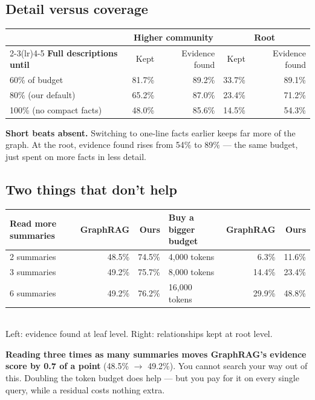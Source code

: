 \documentclass[11pt]{article}
\begin{document}
\subsection{Detail versus coverage}

\begin{center}\small
\begin{tabular}{lrrrr}
\toprule
& \multicolumn{2}{c}{\textbf{Higher community}} & \multicolumn{2}{c}{\textbf{Root}} \\
\cmidrule(lr){2-3}\cmidrule(lr){4-5}
\textbf{Full descriptions until} & Kept & Evidence found & Kept & Evidence found \\
\midrule
60\% of budget  & 81.7\% & 89.2\% & 33.7\% & 89.1\% \\
80\% (our default) & 65.2\% & 87.0\% & 23.4\% & 71.2\% \\
100\% (no compact facts) & 48.0\% & 85.6\% & 14.5\% & 54.3\% \\
\bottomrule
\end{tabular}
\end{center}

\noindent\textbf{Short beats absent.} Switching to one-line facts earlier keeps far more of the graph. At the root, evidence found rises from 54\% to 89\% --- the same budget, just spent on more facts in less detail.

\subsection{Two things that don't help}

\begin{center}\small
\begin{tabular}{lrr@{\hskip 24pt}lrr}
\toprule
\textbf{Read more summaries} & GraphRAG & Ours & \textbf{Buy a bigger budget} & GraphRAG & Ours \\
\midrule
2 summaries & 48.5\% & 74.5\% & 4{,}000 tokens  & 6.3\%  & 11.6\% \\
3 summaries & 49.2\% & 75.7\% & 8{,}000 tokens  & 14.4\% & 23.4\% \\
6 summaries & 49.2\% & 76.2\% & 16{,}000 tokens & 29.9\% & 48.8\% \\
\bottomrule
\end{tabular}\\[2pt]
{\footnotesize Left: evidence found at leaf level. Right: relationships kept at root level.}
\end{center}

\begin{keybox}
\textbf{Reading three times as many summaries moves GraphRAG's evidence score by 0.7 of a point} (48.5\% $\rightarrow$ 49.2\%). You cannot search your way out of this. Doubling the token budget does help --- but you pay for it on every single query, while a residual costs nothing extra.
\end{keybox}
\end{document}
